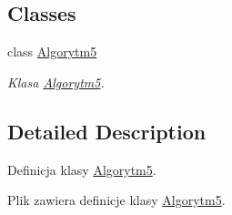 \subsection*{Classes}
\begin{DoxyCompactItemize}
\item 
class \hyperlink{a00006}{Algorytm5}
\begin{DoxyCompactList}\small\item\em Klasa \hyperlink{a00006}{Algorytm5}. \end{DoxyCompactList}\end{DoxyCompactItemize}


\subsection{Detailed Description}
Definicja klasy \hyperlink{a00006}{Algorytm5}. 

Plik zawiera definicje klasy \hyperlink{a00006}{Algorytm5}. 